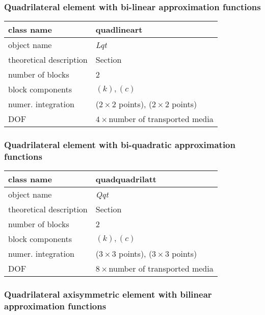 \subsubsection{Quadrilateral element with bi-linear approximation functions}

\begin{center}
\begin{tabular}{|l|l|}
\hline
class name & {\sf quadlineart}
\\ \hline
object name & {\it Lqt}
\\ \hline
theoretical description & Section \label{quadlint}
\\ \hline
number of blocks & 2
\\ \hline
block components & $(k), (c)$
\\ \hline
numer. integration & ($2 \times 2$ points), ($2 \times 2$ points)
\\ \hline
DOF & $4 \times$number of transported media
\\ \hline
\end{tabular}
\end{center}


\subsubsection{Quadrilateral element with bi-quadratic approximation functions}

\begin{center}
\begin{tabular}{|l|l|}
\hline
class name & {\sf quadquadrilatt}
\\ \hline
object name & {\it Qqt}
\\ \hline
theoretical description & Section \label{quadquadt}
\\ \hline
number of blocks & 2
\\ \hline
block components & $(k), (c)$
\\ \hline
numer. integration & ($3 \times 3$ points), ($3 \times 3$ points)
\\ \hline
DOF & $8 \times$number of transported media
\\ \hline
\end{tabular}
\end{center}


\subsubsection{Quadrilateral axisymmetric element with bilinear approximation functions}

